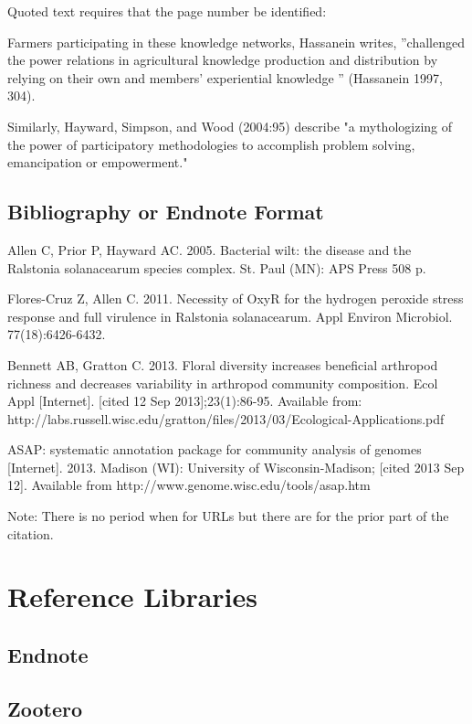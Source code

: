 \documentclass{article}\usepackage[]{graphicx}\usepackage[]{color}
\begin{document}
\noindent Quoted text requires that the page number be identified: 

Farmers participating in these knowledge networks, Hassanein writes, ''challenged the power relations in agricultural knowledge production and distribution by relying on their own and members' experiential knowledge '' (Hassanein 1997, 304).

Similarly, Hayward, Simpson, and Wood (2004:95) describe "a mythologizing of the power of participatory methodologies to accomplish problem solving, emancipation or empowerment."

\subsection{Bibliography or Endnote Format}

Allen C, Prior P, Hayward AC. 2005. Bacterial wilt: the disease and the Ralstonia solanacearum species complex. 
St. Paul (MN): APS Press 508 p.

Flores-Cruz Z, Allen C. 2011. Necessity of OxyR for the hydrogen peroxide stress response and full virulence in Ralstonia solanacearum. 
Appl Environ Microbiol. 77(18):6426-6432.

Bennett AB, Gratton C. 2013. Floral diversity increases beneficial arthropod richness and decreases variability in arthropod community composition. 
Ecol Appl [Internet]. [cited 12 Sep 2013];23(1):86-95. 
Available from: http://labs.russell.wisc.edu/gratton/files/2013/03/Ecological-Applications.pdf

ASAP: systematic annotation package for community analysis of genomes [Internet]. 2013. Madison (WI): University of Wisconsin-Madison; [cited 2013 Sep 12]. 
Available from http://www.genome.wisc.edu/tools/asap.htm

Note: There is no period when for URLs but there are for the prior part of the citation.

\section{Reference Libraries}

\subsection{Endnote}

\subsection{Zootero}
\end{document}

